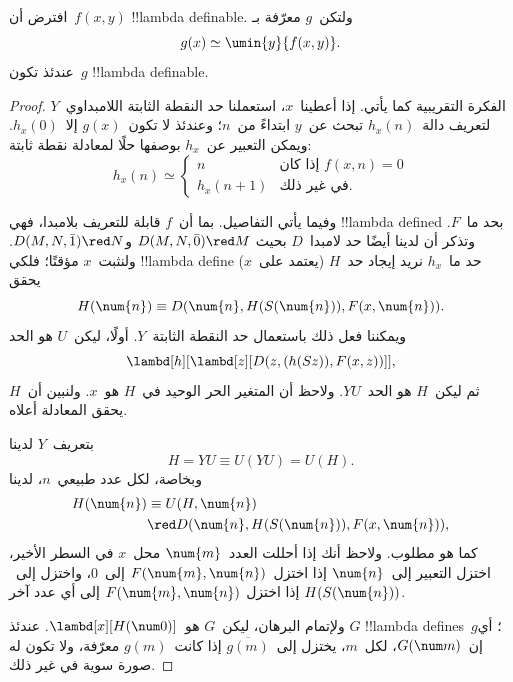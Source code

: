 \documentclass[../../../include/open-logic-section]{subfiles}
\begin{document}

\begin{lem}
افترض أن~$f(x,y)$ !!{lambda definable}. ولتكن~$g$ معرّفة بـ
\[
g(x) \simeq \umin{y}{f(x,y)}.
\]
عندئذ تكون~$g$ !!{lambda definable}.
\end{lem}

\begin{proof}
الفكرة التقريبية كما يأتي. إذا أعطينا~$x$، استعملنا حد النقطة الثابتة
اللامبداوي~$Y$ لتعريف دالة~$h_x(n)$ تبحث عن~$y$ ابتداءً من~$n$؛ وعندئذ
لا تكون~$g(x)$ إلا~$h_x(0)$. ويمكن التعبير عن~$h_x$ بوصفها حلًا لمعادلة
نقطة ثابتة:
\[
h_x(n) \simeq
\begin{cases}
n & \text{إذا كان $f(x,n) = 0$} \\
h_x(n+1) & \text{في غير ذلك.}
\end{cases}
\]

وفيما يأتي التفاصيل. بما أن~$f$ قابلة للتعريف بلامبدا، فهي
!!{lambda defined} بحد ما~$F$. وتذكر أن لدينا أيضًا حد لامبدا~$D$ بحيث
$D(M, N, \bar{0}) \red M$ و$D(M, N, \bar{1}) \red N$. ولنثبت~$x$ مؤقتًا؛
فلكي !!{lambda define} حد ما~$h_x$ نريد إيجاد حد~$H$ (يعتمد على~$x$) يحقق
\[
H(\num{n}) \equiv D(\num{n}, H(S(\num{n})), F(x, \num{n})).
\]
ويمكننا فعل ذلك باستعمال حد النقطة الثابتة~$Y$. أولًا، ليكن~$U$ هو الحد
\[
\lambd[h][\lambd[z][D(z,(h(Sz)),F(x,z))]],
\]
ثم ليكن~$H$ هو الحد~$YU$. ولاحظ أن المتغير الحر الوحيد في~$H$ هو~$x$.
ولنبين أن~$H$ يحقق المعادلة أعلاه.

بتعريف~$Y$ لدينا
\[
H = YU \equiv U(YU) = U(H).
\]
وبخاصة، لكل عدد طبيعي~$n$، لدينا
\begin{align*}
H(\num{n}) & \equiv U(H, \num{n}) \\
& \red D(\num{n}, H(S(\num{n})), F(x, \num{n})),
\end{align*}
كما هو مطلوب. ولاحظ أنك إذا أحللت العدد~$\num{m}$ محل~$x$ في السطر
الأخير، اختزل التعبير إلى~$\num{n}$ إذا اختزل~$F(\num{m}, \num{n})$
إلى~$\num{0}$، واختزل إلى~$H(S(\num{n}))$ إذا اختزل
$F(\num{m}, \num{n})$ إلى أي عدد آخر.

ولإتمام البرهان، ليكن~$G$ هو~$\lambd[x][H(\num 0)]$. عندئذ
$G$ !!{lambda define}s~$g$؛ أي إن~$G(\num m)$، لكل~$m$، يختزل
إلى~$\overline {g(m)}$ إذا كانت~$g(m)$ معرّفة، ولا تكون له صورة سوية في
غير ذلك.
\end{proof}
\end{document}
